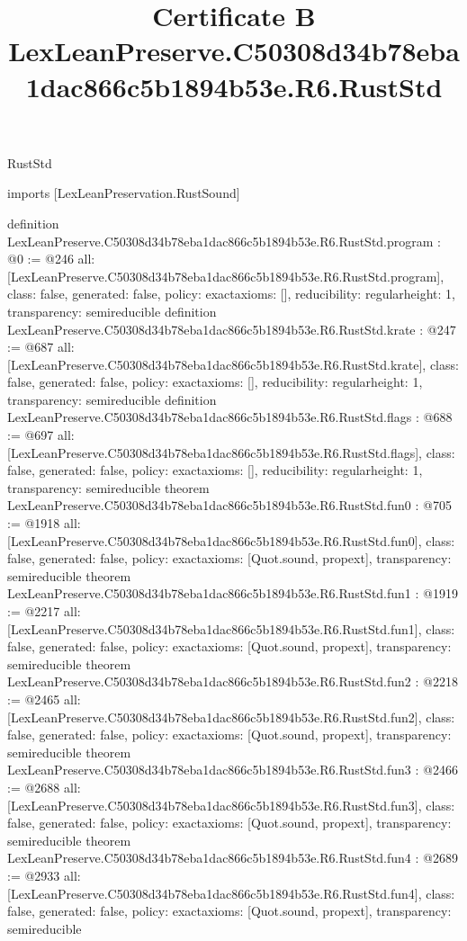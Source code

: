 \begin{lexlean}{RustStd}
\title{Certificate B LexLeanPreserve.C50308d34b78eba1dac866c5b1894b53e.R6.RustStd}
\begin{coremodule}
imports [LexLeanPreservation.RustSound]

definition LexLeanPreserve.C50308d34b78eba1dac866c5b1894b53e.R6.RustStd.program : @0 := @246 {
  all: [LexLeanPreserve.C50308d34b78eba1dac866c5b1894b53e.R6.RustStd.program],
  class: false,
  generated: false,
  policy: exact{axioms: []},
  reducibility: regular{height: 1},
  transparency: semireducible
}
definition LexLeanPreserve.C50308d34b78eba1dac866c5b1894b53e.R6.RustStd.krate : @247 := @687 {
  all: [LexLeanPreserve.C50308d34b78eba1dac866c5b1894b53e.R6.RustStd.krate],
  class: false,
  generated: false,
  policy: exact{axioms: []},
  reducibility: regular{height: 1},
  transparency: semireducible
}
definition LexLeanPreserve.C50308d34b78eba1dac866c5b1894b53e.R6.RustStd.flags : @688 := @697 {
  all: [LexLeanPreserve.C50308d34b78eba1dac866c5b1894b53e.R6.RustStd.flags],
  class: false,
  generated: false,
  policy: exact{axioms: []},
  reducibility: regular{height: 1},
  transparency: semireducible
}
theorem LexLeanPreserve.C50308d34b78eba1dac866c5b1894b53e.R6.RustStd.fun0 : @705 := @1918 {
  all: [LexLeanPreserve.C50308d34b78eba1dac866c5b1894b53e.R6.RustStd.fun0],
  class: false,
  generated: false,
  policy: exact{axioms: [Quot.sound, propext]},
  transparency: semireducible
}
theorem LexLeanPreserve.C50308d34b78eba1dac866c5b1894b53e.R6.RustStd.fun1 : @1919 := @2217 {
  all: [LexLeanPreserve.C50308d34b78eba1dac866c5b1894b53e.R6.RustStd.fun1],
  class: false,
  generated: false,
  policy: exact{axioms: [Quot.sound, propext]},
  transparency: semireducible
}
theorem LexLeanPreserve.C50308d34b78eba1dac866c5b1894b53e.R6.RustStd.fun2 : @2218 := @2465 {
  all: [LexLeanPreserve.C50308d34b78eba1dac866c5b1894b53e.R6.RustStd.fun2],
  class: false,
  generated: false,
  policy: exact{axioms: [Quot.sound, propext]},
  transparency: semireducible
}
theorem LexLeanPreserve.C50308d34b78eba1dac866c5b1894b53e.R6.RustStd.fun3 : @2466 := @2688 {
  all: [LexLeanPreserve.C50308d34b78eba1dac866c5b1894b53e.R6.RustStd.fun3],
  class: false,
  generated: false,
  policy: exact{axioms: [Quot.sound, propext]},
  transparency: semireducible
}
theorem LexLeanPreserve.C50308d34b78eba1dac866c5b1894b53e.R6.RustStd.fun4 : @2689 := @2933 {
  all: [LexLeanPreserve.C50308d34b78eba1dac866c5b1894b53e.R6.RustStd.fun4],
  class: false,
  generated: false,
  policy: exact{axioms: [Quot.sound, propext]},
  transparency: semireducible
}
\end{coremodule}
\end{lexlean}
